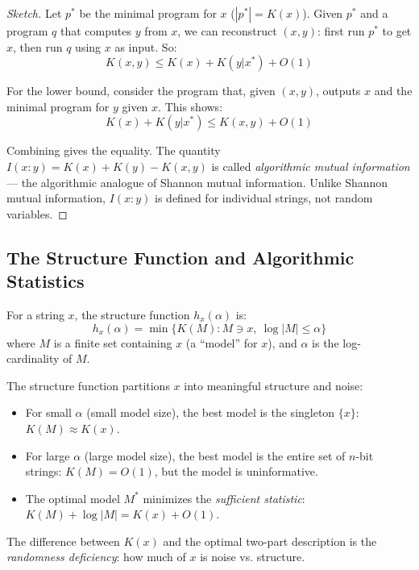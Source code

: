 \begin{proof}[Sketch]
Let $p^*$ be the minimal program for $x$ ($|p^*| = K(x)$). Given $p^*$ and a program $q$ that computes $y$ from $x$, we can reconstruct $(x,y)$: first run $p^*$ to get $x$, then run $q$ using $x$ as input. So:
\[
K(x,y) \le K(x) + K(y|x^*) + O(1)
\]

For the lower bound, consider the program that, given $(x,y)$, outputs $x$ and the minimal program for $y$ given $x$. This shows:
\[
K(x) + K(y|x^*) \le K(x,y) + O(1)
\]

Combining gives the equality. The quantity $I(x:y) = K(x) + K(y) - K(x,y)$ is called \emph{algorithmic mutual information} --- the algorithmic analogue of Shannon mutual information. Unlike Shannon mutual information, $I(x:y)$ is defined for individual strings, not random variables.
\end{proof}

\subsection{The Structure Function and Algorithmic Statistics}
\label{sec:kolmogorov:structure}

\begin{definition}
For a string $x$, the structure function $h_x(\alpha)$ is:
\[
h_x(\alpha) = \min \{ K(M) : M \ni x,\ \log |M| \le \alpha \}
\]
where $M$ is a finite set containing $x$ (a ``model'' for $x$), and $\alpha$ is the log-cardinality of $M$.
\end{definition}

The structure function partitions $x$ into meaningful structure and noise:
\begin{itemize}
\item For small $\alpha$ (small model size), the best model is the singleton $\{x\}$: $K(M) \approx K(x)$.
\item For large $\alpha$ (large model size), the best model is the entire set of $n$-bit strings: $K(M) = O(1)$, but the model is uninformative.
\item The optimal model $M^*$ minimizes the \emph{sufficient statistic}: $K(M) + \log |M| = K(x) + O(1)$.
\end{itemize}

The difference between $K(x)$ and the optimal two-part description is the \emph{randomness deficiency}: how much of $x$ is noise vs. structure.


